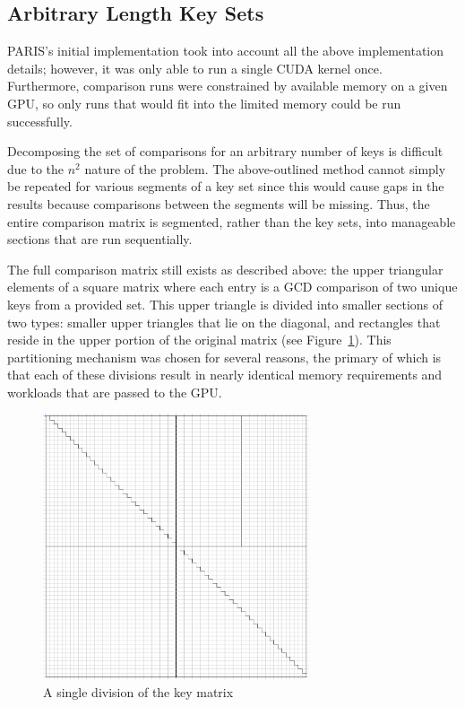 \documentclass[smallextended]{svjour3}       %
\begin{document}
\subsection{Arbitrary Length Key Sets}
\label{subsec:arblength}
PARIS's initial implementation \citep{scharfglass2012breaking} took into
account all the above implementation details; however, it was only able to run
a single CUDA kernel once. Furthermore, comparison runs were constrained by
available memory on a given GPU, so only runs that would fit into the limited
memory could be run successfully.

Decomposing the set of comparisons for an arbitrary number of keys is difficult
due to the $n^2$ nature of the problem. The above-outlined method cannot simply
be repeated for various segments of a key set since this would cause gaps in
the results because comparisons between the segments will be missing. Thus, the
entire comparison matrix is segmented, rather than the key sets, into
manageable sections that are run sequentially.

The full comparison matrix still exists as described above: the upper
triangular elements of a square matrix where each entry is a GCD comparison of
two unique keys from a provided set. This upper triangle is divided into
smaller sections of two types: smaller upper triangles that lie on the
diagonal, and rectangles that reside in the upper portion of the original
matrix (see Figure~\ref{fig:divkeys1}). This partitioning mechanism was chosen
for several reasons, the primary of which is that each of these divisions
result in nearly identical memory requirements and workloads that are passed
to the GPU. 

\begin{figure}
   \centering
   \includegraphics[width=0.7\textwidth]{one_division}
   \caption{A single division of the key matrix}
   \label{fig:divkeys1}
\end{figure}
\end{document}
